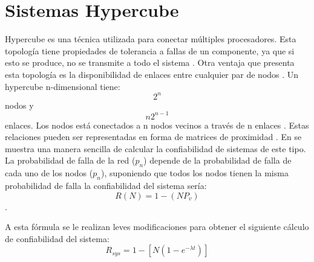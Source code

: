 \section{Sistemas Hypercube}\label{sec:hypercube}
Hypercube es una técnica utilizada para
conectar múltiples procesadores. Esta topología
tiene propiedades de tolerancia a fallas de un
componente, ya que si esto se produce, no se
transmite a todo el sistema \citep{Rong96}. Otra ventaja que
presenta esta topología es la disponibilidad de
enlaces entre cualquier par de nodos \citep{Mostafa14}. Un
hypercube n-dimensional tiene: $$2^n $$ nodos y $$n2^{n-1}$$ enlaces.
Los nodos está conectados a n nodos vecinos a través de n enlaces \citep{Rong96}. Estas
relaciones pueden ser representadas en forma de matrices de proximidad \citep{Mostafa14}.
En \cite{Mostafa14} se muestra una manera sencilla de calcular la confiabilidad
de sistemas de este tipo. La probabilidad de falla de la red ($p_n$) depende
de la probabilidad de falla de cada uno de los nodos ($p_n$), suponiendo
que todos los nodos tienen la misma probabilidad de falla la confiabilidad
del sistema sería: $$R(N) = 1 -(NP_v)$$.

A esta fórmula se le realizan leves modificaciones
para obtener el siguiente cálculo de confiabilidad del sistema: $$ R_{sys} = 1 - [N(1-e^{- \lambda t})]$$
